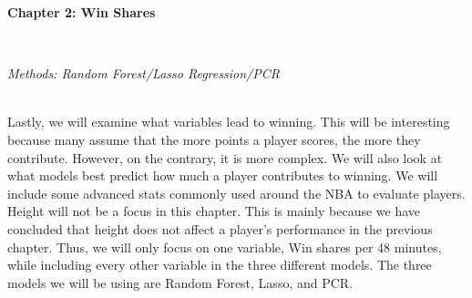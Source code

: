 \documentclass[11pt,letterpaper]{amsart}
\begin{document}
\newpage
\begin{Large}
\textbf{Chapter 2: Win Shares}
\end{Large}\\

\begin{center}
\emph{{\LARGE Methods: Random Forest/Lasso Regression/PCR}}
\end{center} \leavevmode\\
\indent Lastly, we will examine what variables lead to winning. This will be interesting because many assume that the more points a player scores, the more they contribute. However, on the contrary, it is more complex. We will also look at what models best predict how much a player contributes to winning. We will include some advanced stats commonly used around the NBA to evaluate players. Height will not be a focus in this chapter. This is mainly because we have concluded that height does not affect a player's performance in the previous chapter. Thus, we will only focus on one variable, Win shares per 48 minutes, while including every other variable in the three different models. The three models we will be using are Random Forest, Lasso, and PCR.
\end{document}
